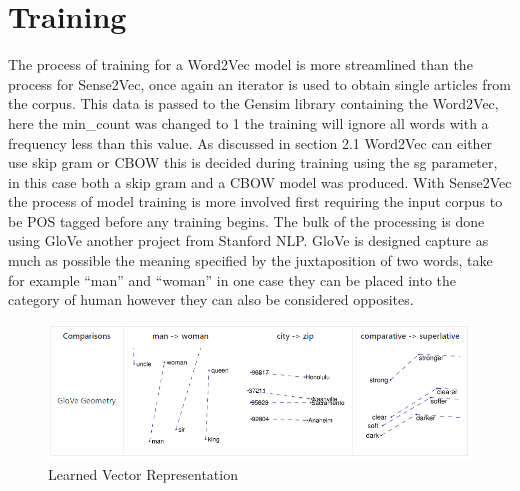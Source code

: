 \section{Training}
The process of training for a Word2Vec model is more streamlined than the process for Sense2Vec, once again an iterator is used to obtain single articles from the corpus. This data is passed to the Gensim library containing the Word2Vec, here the min\_count was changed to 1 the training will ignore all words with a frequency less than this value. As discussed in section 2.1 Word2Vec can either use skip gram or CBOW this is decided during training using the sg parameter, in this case both a skip gram and a CBOW model was produced. With Sense2Vec the process of model training is more involved first requiring the input corpus to be POS tagged before any training begins. The bulk of the processing is done using GloVe another project from Stanford NLP. GloVe is designed capture as much as possible the meaning specified by the juxtaposition of two words, take for example “man” and “woman” in one case they can be placed into the category of human however they can also be considered opposites. \cite{Pennington} 

\begin{figure}[h]
    \centering
    \includegraphics[scale=0.65]{images/GloVe.PNG}
    \caption{Learned Vector Representation}
    \label{fig:GloVe}
\end{figure}

